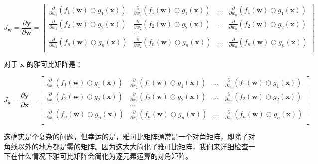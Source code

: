 \documentclass[lang=cn,newtx,10pt,scheme=chinese]{elegantbook}
\begin{document}
\[J_\mathbf{w} = 
\frac{\partial \mathbf{y}}{\partial \mathbf{w}}  = \begin{bmatrix}
\frac{\partial}{\partial w_1} ( f_{1}(\mathbf{w}) \bigcirc g_{1}(\mathbf{x}) ) & \frac{\partial}{\partial w_2} ( f_{1}(\mathbf{w}) \bigcirc g_{1}(\mathbf{x}) ) & \ldots & \frac{\partial}{\partial w_n} ( f_{1}(\mathbf{w}) \bigcirc g_{1}(\mathbf{x}) )\\
\frac{\partial}{\partial w_1} ( f_{2}(\mathbf{w}) \bigcirc g_{2}(\mathbf{x}) ) & \frac{\partial}{\partial w_2} ( f_{2}(\mathbf{w}) \bigcirc g_{2}(\mathbf{x}) ) & \ldots & \frac{\partial}{\partial w_n} ( f_{2}(\mathbf{w}) \bigcirc g_{2}(\mathbf{x}) )\\
& \ldots\\
\frac{\partial}{\partial w_1} ( f_{n}(\mathbf{w}) \bigcirc g_{n}(\mathbf{x}) ) & \frac{\partial}{\partial w_2} ( f_{n}(\mathbf{w}) \bigcirc g_{n}(\mathbf{x}) ) & \ldots & \frac{\partial}{\partial w_n} ( f_{n}(\mathbf{w}) \bigcirc g_{n}(\mathbf{x}) )\\
\end{bmatrix}\]

对于 $\mathbf{x}$ 的雅可比矩阵是：

\[J_\mathbf{x} = 
\frac{\partial \mathbf{y}}{\partial \mathbf{x}}  = \begin{bmatrix}
\frac{\partial}{\partial x_1} ( f_{1}(\mathbf{w}) \bigcirc g_{1}(\mathbf{x}) ) & \frac{\partial}{\partial x_2} ( f_{1}(\mathbf{w}) \bigcirc g_{1}(\mathbf{x}) ) & \ldots & \frac{\partial}{\partial x_n} ( f_{1}(\mathbf{w}) \bigcirc g_{1}(\mathbf{x}) )\\
\frac{\partial}{\partial x_1} ( f_{2}(\mathbf{w}) \bigcirc g_{2}(\mathbf{x}) ) & \frac{\partial}{\partial x_2} ( f_{2}(\mathbf{w}) \bigcirc g_{2}(\mathbf{x}) ) & \ldots & \frac{\partial}{\partial x_n} ( f_{2}(\mathbf{w}) \bigcirc g_{2}(\mathbf{x}) )\\
& \ldots\\
\frac{\partial}{\partial x_1} ( f_{n}(\mathbf{w}) \bigcirc g_{n}(\mathbf{x}) ) & \frac{\partial}{\partial x_2} ( f_{n}(\mathbf{w}) \bigcirc g_{n}(\mathbf{x}) ) & \ldots & \frac{\partial}{\partial x_n} ( f_{n}(\mathbf{w}) \bigcirc g_{n}(\mathbf{x}) )\\
\end{bmatrix}\]

这确实是个复杂的问题，但幸运的是，雅可比矩阵通常是一个对角矩阵，即除了对角线以外的地方都是零的矩阵。因为这大大简化了雅可比矩阵，我们来详细检查一下在什么情况下雅可比矩阵会简化为逐元素运算的对角矩阵。
\end{document}
